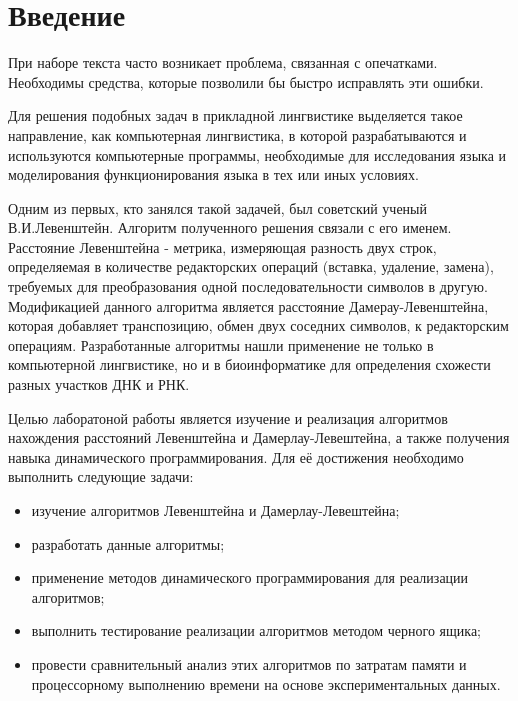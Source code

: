 \chapter*{Введение}
При наборе текста часто возникает проблема, связанная с опечатками. Необходимы средства, которые позволили бы быстро исправлять эти ошибки.

Для решения подобных задач в прикладной лингвистике выделяется такое направление, как компьютерная лингвистика, в которой разрабатываются и используются компьютерные программы, необходимые для исследования языка и моделирования функционирования языка в тех или иных условиях\cite{book1}.

Одним из первых, кто занялся такой задачей, был советский ученый В.И.Левенштейн\cite{Levenshtein}. Алгоритм полученного решения связали с его именем. Расстояние Левенштейна - метрика, измеряющая разность двух строк, определяемая в количестве редакторских операций (вставка, удаление, замена), требуемых для преобразования одной последовательности символов в другую. Модификацией данного алгоритма является расстояние Дамерау-Левенштейна, которая добавляет транспозицию, обмен двух соседних символов, к редакторским операциям. Разработанные алгоритмы нашли применение не только в компьютерной лингвистике, но и в биоинформатике для определения схожести разных участков ДНК и РНК.

Целью лаборатоной работы является изучение и реализация алгоритмов нахождения расстояний Левенштейна и Дамерлау-Левештейна, а также получения навыка динамического программирования. Для её достижения необходимо выполнить следующие задачи:
\begin{itemize}
	\item изучение алгоритмов Левенштейна и Дамерлау-Левештейна;
	\item разработать данные алгоритмы;
	\item применение методов динамического программирования для реализации алгоритмов;
	\item выполнить тестирование реализации алгоритмов методом черного ящика;
	\item провести сравнительный анализ этих алгоритмов по затратам памяти и процессорному выполнению времени на основе экспериментальных данных.
\end{itemize}